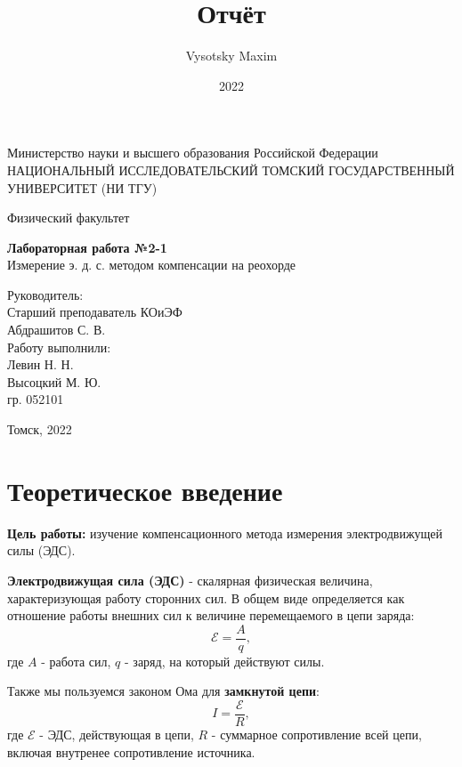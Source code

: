 \documentclass[a4paper,12pt]{article}
\author{Vysotsky Maxim}
\title{Отчёт}
\date{2022}
\begin{document}
	\begin{titlepage}
		\begin{center}
			{Министерство науки и высшего образования Российской Федерации
				НАЦИОНАЛЬНЫЙ ИССЛЕДОВАТЕЛЬСКИЙ ТОМСКИЙ
				ГОСУДАРСТВЕННЫЙ УНИВЕРСИТЕТ (НИ ТГУ)}
		\end{center}
		\begin{center}
			{Физический факультет}
		\end{center}
		
		
		\vspace{8cm}
		{
			\begin{center}
				{\bf Лабораторная работа №2-1}\\
				Измерение э. д. с. методом компенсации на реохорде
			\end{center}
		}
		\vspace{2cm}
		\begin{flushright}
			{Руководитель:\\ Старший преподаватель КОиЭФ\\
				Абдрашитов С. В. \\
				Работу выполнили:\\
				Левин Н. Н. \\
				Высоцкий М. Ю.\\
				\vspace{0.2cm}
				гр. 052101}
		\end{flushright}
		\vspace{3cm}
		\begin{center}
			Томск, 2022
		\end{center}
	\end{titlepage}

\section{Теоретическое введение}
\textbf{Цель работы:} изучение компенсационного метода измерения электродвижущей силы (ЭДС).

\textbf{Электродвижущая сила (ЭДС)} - скалярная физическая величина, характеризующая работу сторонних сил. В общем виде определяется как отношение работы внешних сил к величине перемещаемого в цепи заряда:
$$\mathcal{E} = \frac{A}{q},$$
где $A$ - работа сил, $q$ - заряд, на который действуют силы.

Также мы пользуемся законом Ома для \textbf{замкнутой цепи}:
\begin{equation}\label{Om}
	I = \frac{\mathcal{E}}{R},
\end{equation}	
где $\mathcal{E}$ - ЭДС, действующая в цепи, $R$ - суммарное сопротивление всей цепи, включая внутренее сопротивление источника.
\end{document}
